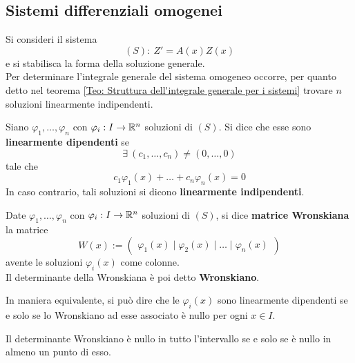 \subsection{Sistemi differenziali omogenei}
Si consideri il sistema
\begin{equation}
    (S):\ Z'= A(x)Z(x)
\end{equation}
e si stabilisca la forma della soluzione generale.\\
Per determinare l'integrale generale del sistema omogeneo occorre, per quanto detto nel teorema \ref{Teo: Struttura dell'integrale generale per i sistemi} trovare $n$ soluzioni linearmente indipendenti.
\begin{definition} \label{Def: Soluzioni linearmente dipendenti/indipendenti}
    Siano $\varphi_1, \dots, \varphi_n$ con $\varphi_i:I \to \mathbb{R}^n$ 
    soluzioni di $(S)$. Si dice che esse sono \textbf{linearmente dipendenti} se 
    \begin{equation}
        \exists\ (c_1, \dots, c_n) \neq (0, \dots, 0)
    \end{equation}
    tale che
    \begin{equation}
        c_1 \varphi_1(x)+ \dots
        +c_n \varphi_n(x) = 0
    \end{equation}
    In caso contrario, tali soluzioni si dicono \textbf{linearmente indipendenti}.
\end{definition}
\begin{definition} \label{Def: Matrice Wronskiana}
    Date $\varphi_1, \dots, \varphi_n$ con $\varphi_i:I \to \mathbb{R}^n$ 
    soluzioni di $(S)$, si dice \textbf{matrice Wronskiana} la matrice
    \begin{equation}
        W(x):= \begin{pmatrix}
        \varphi_1(x)\mid \varphi_2(x)\mid  \dots \mid \varphi_n(x)
        \end{pmatrix}
    \end{equation}
avente le soluzioni $\varphi_i(x)$ come colonne.\\
Il determinante della Wronskiana è poi detto \textbf{Wronskiano}.
\end{definition}
In maniera equivalente, si può dire che le $\varphi_i(x)$ sono linearmente dipendenti se e solo se lo Wronskiano ad esse associato è nullo per ogni $x \in I$.
\begin{proposition} \label{Prop: Wronskiano nullo sse nullo in I}
    Il determinante Wronskiano è nullo in tutto l'intervallo se e solo se è nullo in almeno un punto di esso.
\end{proposition}
